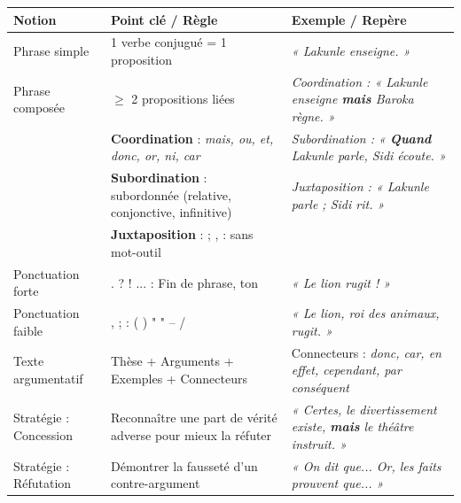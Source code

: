 \documentclass[11pt]{article}
\begin{document}
\begin{bilan}
\begin{center}
\begin{tabularx}{\linewidth}{|l|X|X|}
\hline
\rowcolor{popblueL}
\textbf{Notion} & \textbf{Point clé / Règle} & \textbf{Exemple / Repère} \\
\hline
Phrase simple & 1 verbe conjugué = 1 proposition & \textit{« Lakunle enseigne. »} \\
\hline
Phrase composée & $\ge$ 2 propositions liées & \textit{Coordination : « Lakunle enseigne \textbf{mais} Baroka règne. »} \\
 & \textbf{Coordination} : \textit{mais, ou, et, donc, or, ni, car} & \textit{Subordination : « \textbf{Quand} Lakunle parle, Sidi écoute. »} \\
 & \textbf{Subordination} : subordonnée (relative, conjonctive, infinitive) & \textit{Juxtaposition : « Lakunle parle ; Sidi rit. »} \\
 & \textbf{Juxtaposition} : ; , : sans mot-outil & \\
\hline
Ponctuation forte & . ? ! ... : Fin de phrase, ton & \textit{« Le lion rugit ! »} \\
\hline
Ponctuation faible & , ; : ( ) " " -- / & \textit{« Le lion, roi des animaux, rugit. »} \\
\hline
Texte argumentatif & Thèse + Arguments + Exemples + Connecteurs & Connecteurs : \textit{donc, car, en effet, cependant, par conséquent} \\
\hline
Stratégie : Concession & Reconnaître une part de vérité adverse pour mieux la réfuter & \textit{« Certes, le divertissement existe, \textbf{mais} le théâtre instruit. »} \\
\hline
Stratégie : Réfutation & Démontrer la fausseté d'un contre-argument & \textit{« On dit que... Or, les faits prouvent que... »} \\
\hline
\end{tabularx}
\end{center}

\end{bilan}
\end{document}
